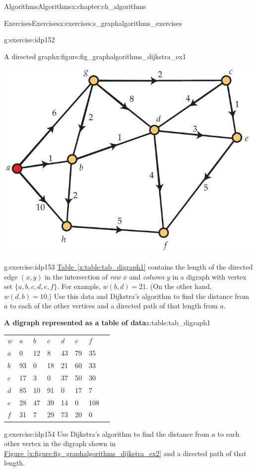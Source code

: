 \documentclass[oneside,10pt,]{book}
\newcommand{\tabularfont}{\relax}
\newcommand{\xreffont}{\relax}
\numberwithin{equation}{section}
\newcommand{\hrulethin}  {\noalign{\hrule height 0.04em}}
\begin{document}
\begin{chapterptx}{Algorithms}{}{Algorithms}{}{}{x:chapter:ch_algorithms}
\begin{exercises-section}{Exercises}{}{Exercises}{}{}{x:exercises:s_graphalgorithms_exercises}
\begin{divisionexercise}{11}{}{}{g:exercise:idp152}
\begin{figureptx}{A directed graph}{x:figure:fig_graphalgorithms_dijkstra_ex1}{}
\begin{image}{0.175}{0.65}{0.175}%
\includegraphics[width=\linewidth]{images/dijkstra_ex1}
\end{image}%
\tcblower
\end{figureptx}%
\end{divisionexercise}%
\begin{divisionexercise}{12}{}{}{g:exercise:idp153}%
\hyperref[x:table:tab_digraph1]{Table~{\xreffont\ref{x:table:tab_digraph1}}} contains the length of the directed edge \((x,y)\) in the intersection of \emph{row} \(x\) and \emph{column} \(y\) in a digraph with vertex set \(\{a,b,c,d,e,f\}\). For example, \(w(b,d)=21\). (On the other hand, \(w(d,b)=10\).) Use this data and Dijkstra's algorithm to find the distance from \(a\) to each of the other vertices and a directed path of that length from \(a\).%
\begin{tableptx}{\textbf{A digraph represented as a table of data}}{x:table:tab_digraph1}{}%
\centering%
{\tabularfont%
\begin{tabular}{lAllllll}
\(w\)&\(a\)&\(b\)&\(c\)&\(d\)&\(e\)&\(f\)\tabularnewline\hrulethin
\(a\)&0&12&8&43&79&35\tabularnewline[0pt]
\(b\)&93&0&18&21&60&33\tabularnewline[0pt]
\(c\)&17&3&0&37&50&30\tabularnewline[0pt]
\(d\)&85&10&91&0&17&7\tabularnewline[0pt]
\(e\)&28&47&39&14&0&108\tabularnewline[0pt]
\(f\)&31&7&29&73&20&0
\end{tabular}
}%
\end{tableptx}%
\end{divisionexercise}%
\begin{divisionexercise}{13}{}{}{g:exercise:idp154}%
Use Dijkstra's algorithm to find the distance from \(a\) to each other vertex in the digraph shown in \hyperref[x:figure:fig_graphalgorithms_dijkstra_ex2]{Figure~{\xreffont\ref{x:figure:fig_graphalgorithms_dijkstra_ex2}}} and a directed path of that length.%

\end{divisionexercise}
\end{exercises-section}
\end{chapterptx}
\end{document}
